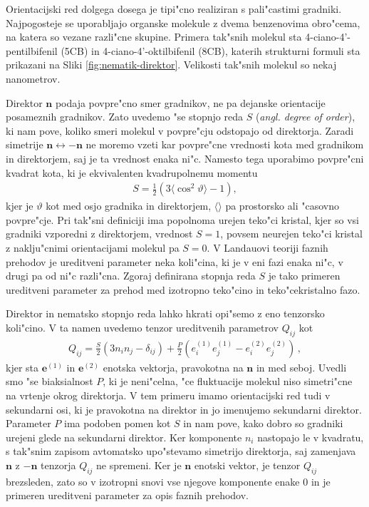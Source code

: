 \documentclass[a4paper,10pt]{article}
\newcommand{\angl}[1]{(\textit{angl. #1})}
\begin{document}
Orientacijski red dolgega dosega je tipi"cno realiziran s pali"castimi gradniki. Najpogosteje se uporabljajo organske molekule z dvema benzenovima obro"cema, na katera so vezane razli"cne skupine. Primera tak"snih molekul sta 4-ciano-4'-pentilbifenil (5CB) in 4-ciano-4'-oktilbifenil (8CB), katerih strukturni formuli sta prikazani na Sliki \ref{fig:nematik-direktor}. Velikosti tak"snih molekul so nekaj nanometrov. 

Direktor $\mathbf{n}$ podaja povpre"cno smer gradnikov, ne pa dejanske orientacije posameznih gradnikov. 
Zato uvedemo "se stopnjo reda $S$ \angl{degree of order}, ki nam pove, koliko smeri molekul v povpre"cju odstopajo od direktorja. 
Zaradi simetrije $\mathbf{n} \leftrightarrow -\mathbf{n}$ ne moremo vzeti kar povpre"cne vrednosti kota med gradnikom in direktorjem, saj je ta vrednost enaka ni"c. 
Namesto tega uporabimo povpre"cni kvadrat kota, ki je ekvivalenten kvadrupolnemu momentu\cite{kleman}
\begin{align}
 S = \frac{1}{2}\left(3\langle\cos^2\vartheta\rangle-1\right),
\end{align}
kjer je $\vartheta$ kot med osjo gradnika in direktorjem, $\langle\rangle$ pa prostorsko ali "casovno povpre"cje. 
Pri tak"sni definiciji ima popolnoma urejen teko"ci kristal, kjer so vsi gradniki vzporedni z direktorjem, vrednost $S=1$, povsem neurejen teko"ci kristal z naklju"cnimi orientacijami molekul pa $S=0$. 
V Landauovi teoriji faznih prehodov je ureditveni parameter neka koli"cina, ki je v eni fazi enaka ni"c, v drugi pa od ni"c razli"cna. 
Zgoraj definirana stopnja reda $S$ je tako primeren ureditveni parameter za prehod med izotropno teko"cino in teko"cekristalno fazo\cite{degennes}. 

Direktor in nematsko stopnjo reda lahko hkrati opi"semo z eno tenzorsko koli"cino. V ta namen uvedemo tenzor ureditvenih parametrov $Q_{ij}$ kot
\begin{align}
  Q_{ij} = \frac{S}{2}(3n_i n_j - \delta_{ij}) + \frac{P}{2}(e^{(1)}_i e^{(1)}_j - e^{(2)}_i e^{(2)}_j)\,,
\end{align}
kjer sta $\mathbf{e}^{(1)}$ in $\mathbf{e}^{(2)}$ enotska vektorja, pravokotna na $\mathbf{n}$ in med seboj. Uvedli smo "se biaksialnost $P$, ki je neni"celna, "ce fluktuacije molekul niso simetri"cne na vrtenje okrog direktorja. V tem primeru imamo orientacijski red tudi v sekundarni osi, ki je pravokotna na direktor in jo imenujemo sekundarni direktor. Parameter $P$ ima podoben pomen kot $S$ in nam pove, kako dobro so gradniki urejeni glede na sekundarni direktor. Ker komponente $n_i$ nastopajo le v kvadratu, s tak"snim zapisom avtomatsko upo"stevamo simetrijo direktorja, saj zamenjava $\mathbf{n}$ z $-\mathbf{n}$ tenzorja $Q_{ij}$ ne spremeni. Ker je $\mathbf{n}$ enotski vektor, je tenzor $Q_{ij}$ brezsleden, zato so v izotropni snovi vse njegove komponente enake 0 in je primeren ureditveni parameter za opis faznih prehodov. 
\end{document}

